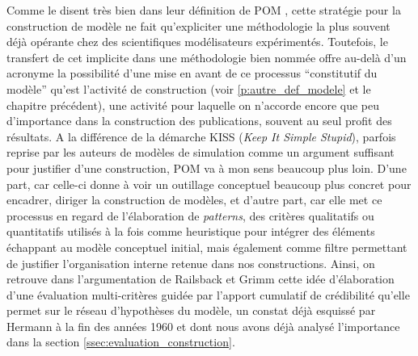 Comme le disent très bien \textcite{Railsback2012} dans leur définition de POM , cette stratégie pour la construction de modèle ne fait qu'expliciter une méthodologie la plus souvent déjà opérante chez des scientifiques modélisateurs expérimentés. Toutefois, le transfert de cet implicite dans une méthodologie bien nommée offre au-delà d'un acronyme la possibilité d'une mise en avant de ce processus \enquote{constitutif du modèle} qu'est l'activité de construction (voir \ref{p:autre_def_modele} et le chapitre précédent), une activité pour laquelle on n'accorde encore que peu d'importance dans la construction des publications, souvent au seul profit des résultats. A la différence de la démarche KISS (\textit{Keep It Simple Stupid}), parfois reprise par les auteurs de modèles de simulation comme un argument suffisant pour justifier d'une construction, POM va à mon sens beaucoup plus loin. D'une part, car celle-ci donne à voir un outillage conceptuel beaucoup plus concret pour encadrer, diriger la construction de modèles, et d'autre part, car elle met ce processus en regard de l'élaboration de \textit{patterns}, des critères qualitatifs ou quantitatifs utilisés à la fois comme heuristique pour intégrer des éléments échappant au modèle conceptuel initial, mais également comme filtre permettant de justifier l'organisation interne retenue dans nos constructions. Ainsi, on retrouve dans l'argumentation de Railsback et Grimm cette idée d'élaboration d'une évaluation multi-critères guidée par l'apport cumulatif de crédibilité qu'elle permet sur le réseau d'hypothèses du modèle, un constat déjà esquissé par Hermann à la fin des années 1960 et dont nous avons déjà analysé l'importance dans la section \ref{ssec:evaluation_construction}. 


